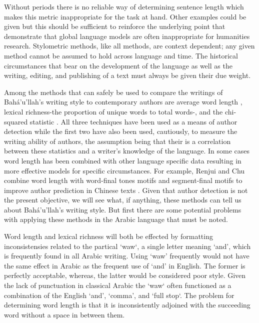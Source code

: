 \documentclass[12pt, oneside]{report}
\begin{document}
Without periods there is no reliable way of determining sentence length which makes this metric inappropriate for the task at hand.
Other examples could be given but this should be sufficient to reinforce the underlying point that demonstrate that global language models are often inappropriate for humanities research.
Stylometric methods, like all methods, are context dependent; any given method cannot be assumed to hold across language and time.
The historical circumstances that bear on the development of the language as well as the writing, editing, and publishing of a text must always be given their due weight.
\par
Among the methods that can safely be used to compare the writings of Bah\'{a}'u'llah's writing style to contemporary authors are average word length \cite{justin_rice_what_2018}, lexical richness-the proportion of unique words to total words-\cite{justin_rice_what_2018}, and the chi-squared statistic  \cite{kilgarriff_comparing_2001} \cite{laramee_introduction_2018}.
All three techniques have been used as a means of author detection while the first two have also been used, cautiously, to measure the writing ability of authors, the assumption being that their is a correlation between these statistics and a writer's knowledge of the language.
In some cases word length has been combined with other language specific data resulting in more effective models for specific circumstances.
For example, Renjui and Chu combine word length with word-final tones motifs and segment-final motifs to improve author prediction in Chinese texts \cite{Renkui and Chu}.
Given that author detection is not the present objective, we will see what, if anything, these methods can tell us about Bah\'{a}'u'llah's writing style. But first there are some potential problems with applying these methods in the Arabic language that must be noted.
\par
Word length and lexical richness will both be effected by formatting inconsistensies related to the partical `waw`, a single letter meaning `and', which is frequently found in all Arabic writing. Using `waw' frequently would not have the same effect in Arabic as the frequent use of `and' in English.
The former is perfectly acceptable, whereas, the latter would be considered poor style.
Given the lack of punctuation in classical Arabic the `waw` often functioned as a combination of the English `and', `comma', and `full stop`.
The problem for determining word length is that it is inconsistently adjoined with the succeeding word without a space in between them.
\end{document}
